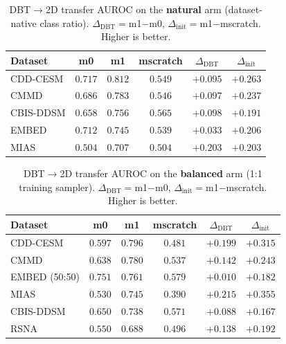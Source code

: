 \documentclass{article}
\begin{document}
\begin{table}[t]
  \centering
  \caption{DBT$\rightarrow$2D transfer AUROC on the \textbf{natural} arm (dataset-native class ratio).
  $\Delta_{\mathrm{DBT}}=$m1$-$m0, $\Delta_{\mathrm{init}}=$m1$-$mscratch. Higher is better.}
  \label{tab:transfer_natural}
  \begin{tabular}{lccccc}
    \toprule
    Dataset & m0 & m1 & mscratch & $\Delta_{\mathrm{DBT}}$ & $\Delta_{\mathrm{init}}$ \\
    \midrule
    CDD-CESM  & $0.717$ & $\mathbf{0.812}$ & $0.549$ & $+0.095$ & $+0.263$ \\
    CMMD      & $0.686$ & $\mathbf{0.783}$ & $0.546$ & $+0.097$ & $+0.237$ \\
    CBIS-DDSM & $0.658$ & $\mathbf{0.756}$ & $0.565$ & $+0.098$ & $+0.191$ \\
    EMBED     & $0.712$ & $\mathbf{0.745}$ & $0.539$ & $+0.033$ & $+0.206$ \\
    MIAS      & $0.504$ & $\mathbf{0.707}$ & $0.504$ & $+0.203$ & $+0.203$ \\
    \bottomrule
  \end{tabular}
\end{table}

\begin{table}[t]
  \centering
  \caption{DBT$\rightarrow$2D transfer AUROC on the \textbf{balanced} arm (1:1 training sampler).
  $\Delta_{\mathrm{DBT}}=$m1$-$m0, $\Delta_{\mathrm{init}}=$m1$-$mscratch. Higher is better.}
  \label{tab:transfer_balanced}
  \begin{tabular}{lccccc}
    \toprule
    Dataset & m0 & m1 & mscratch & $\Delta_{\mathrm{DBT}}$ & $\Delta_{\mathrm{init}}$ \\
    \midrule
    CDD-CESM      & $0.597$ & $\mathbf{0.796}$ & $0.481$ & $+0.199$ & $+0.315$ \\
    CMMD          & $0.638$ & $\mathbf{0.780}$ & $0.537$ & $+0.142$ & $+0.243$ \\
    EMBED (50:50) & $0.751$ & $\mathbf{0.761}$ & $0.579$ & $+0.010$ & $+0.182$ \\
    MIAS          & $0.530$ & $\mathbf{0.745}$ & $0.390$ & $+0.215$ & $+0.355$ \\
    CBIS-DDSM     & $0.650$ & $\mathbf{0.738}$ & $0.571$ & $+0.088$ & $+0.167$ \\
    RSNA          & $0.550$ & $\mathbf{0.688}$ & $0.496$ & $+0.138$ & $+0.192$ \\
    \bottomrule
  \end{tabular}
\end{table}
\end{document}
